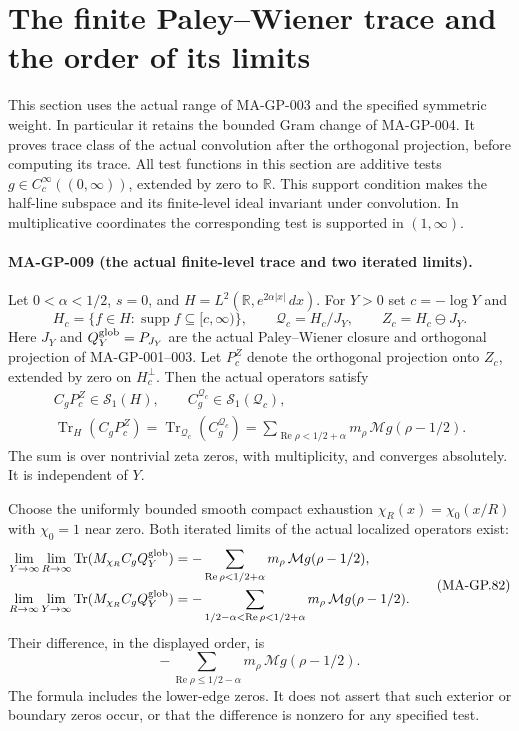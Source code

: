 \section{The finite Paley--Wiener trace and the order of its limits}
\label{sec:global-pw-trace}

This section uses the actual range of MA-GP-003 and the specified
symmetric weight.  In particular it retains the bounded Gram change
of MA-GP-004.  It proves trace class of the actual convolution after
the orthogonal projection, before computing its trace.
All test functions in this section are additive tests
$g\in C_c^\infty((0,\infty))$, extended by zero to $\mathbb R$.
This support condition makes the half-line subspace and its
finite-level ideal invariant under convolution.  In multiplicative
coordinates the corresponding test is supported in $(1,\infty)$.

\paragraph{MA-GP-009 (the actual finite-level trace and two iterated limits).}
Let $0<\alpha<1/2$, $s=0$, and
$H=L^2(\mathbb R,e^{2\alpha|x|}\,dx)$.
For $Y>0$ set $c=-\log Y$ and
\[
 H_c=\{f\in H:\operatorname{supp}f\subseteq[c,\infty)\},
 \qquad \mathcal Q_c=H_c/J_Y,\qquad Z_c=H_c\ominus J_Y .
 \tag{MA-GP.80}
\]
Here $J_Y$ and $Q_Y^{\rm glob}=P_{J_Y}$ are the actual
Paley--Wiener closure and orthogonal projection of MA-GP-001--003.
Let $P_c^Z$ denote the orthogonal projection onto $Z_c$,
extended by zero on $H_c^\perp$.
Then the actual operators satisfy
\[
 \begin{gathered}
 C_gP_c^Z\in\mathcal S_1(H),\qquad
 C_g^{\mathcal Q_c}\in\mathcal S_1(\mathcal Q_c),\\
 \operatorname{Tr}_H(C_gP_c^Z)
 =\operatorname{Tr}_{\mathcal Q_c}(C_g^{\mathcal Q_c})
 =\sum_{\operatorname{Re}\rho<1/2+\alpha}
           m_\rho\,\mathcal Mg(\rho-1/2).
 \end{gathered}
 \tag{MA-GP.81}
\]
The sum is over nontrivial zeta zeros, with multiplicity, and
converges absolutely.  It is independent of $Y$.

Choose the uniformly bounded smooth compact exhaustion
$\chi_R(x)=\chi_0(x/R)$ with $\chi_0=1$ near zero.
Both iterated limits of the actual localized operators exist:
\[
 \begin{aligned}
 \lim_{Y\to\infty}\lim_{R\to\infty}
   \operatorname{Tr}(M_{\chi_R}C_gQ_Y^{\rm glob})
   &=-\sum_{\operatorname{Re}\rho<1/2+\alpha}
                  m_\rho\,\mathcal Mg(\rho-1/2),\\
 \lim_{R\to\infty}\lim_{Y\to\infty}
   \operatorname{Tr}(M_{\chi_R}C_gQ_Y^{\rm glob})
   &=-\sum_{1/2-\alpha<\operatorname{Re}\rho<1/2+\alpha}
                  m_\rho\,\mathcal Mg(\rho-1/2).
 \end{aligned}
 \tag{MA-GP.82}
\]
Their difference, in the displayed order, is
\[
          -\sum_{\operatorname{Re}\rho\le1/2-\alpha}
                         m_\rho\,\mathcal Mg(\rho-1/2).
 \tag{MA-GP.83}
\]
The formula includes the lower-edge zeros.  It does not assert
that such exterior or boundary zeros occur, or that the
difference is nonzero for any specified test.

